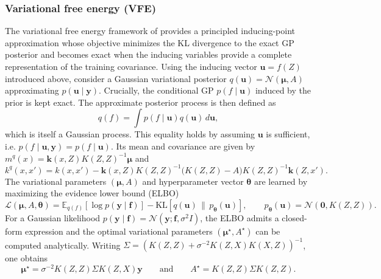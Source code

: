 \documentclass[11pt,a4paper]{article}
\newcommand{\bmu}{\boldsymbol{\mu}}
\newcommand{\by}{\boldsymbol{y}}
\newcommand{\btheta}{\boldsymbol{\theta}}
\begin{document}
\subsubsection{Variational free energy (VFE)}
The variational free energy framework of \cite{Titsias2009VariationalLO} provides a principled inducing-point approximation whose objective minimizes the KL divergence to the exact GP posterior and becomes exact when the inducing variables provide a complete representation of the training covariance. 
Using the inducing vector $\boldsymbol{u}=f(Z)$ introduced above, consider a Gaussian variational posterior $q(\boldsymbol{u})=\mathcal{N}(\bmu,A)$ approximating $p(\boldsymbol{u}\mid \by)$.
Crucially, the conditional GP $p(f\mid \boldsymbol{u})$ induced by the prior is kept exact.
The approximate posterior process is then defined as
\begin{displaymath}q(f)=\int p(f\mid \boldsymbol{u})q(\boldsymbol{u})\,d\boldsymbol{u},\end{displaymath}
which is itself a Gaussian process. This equality holds by assuming $\boldsymbol{u}$ is sufficient, i.e. \begin{math}
    p(f\mid \boldsymbol{u},\by)=p(f\mid \boldsymbol{u}).
\end{math}
Its mean and covariance are given by
$m^q(x)=\boldsymbol{k}(x,Z)K(Z,Z)^{-1}\bmu$ and
\begin{displaymath}
k^q(x,x')=k(x,x')-\boldsymbol{k}(x,Z)K(Z,Z)^{-1}
\bigl(K(Z,Z)-A\bigr)K(Z,Z)^{-1}\boldsymbol{k}(Z,x').
\end{displaymath}
The variational parameters $(\bmu,A)$ and hyperparameter vector $\btheta$ are learned by maximizing the evidence lower bound (ELBO)
\begin{displaymath}\mathcal{L}(\bmu,A,\btheta) = \mathbb{E}_{q(f)}[\log p(\by\mid \boldsymbol{f})] - \mathrm{KL}\!\left[q(\boldsymbol{u})\,\|\,p_{\btheta}(\boldsymbol{u})\right], \qquad p_{\btheta}(\boldsymbol{u})=\mathcal{N}(\bm 0,K(Z,Z)).\end{displaymath}
For a Gaussian likelihood $p(\by\mid \boldsymbol{f})=\mathcal{N}(\by;\boldsymbol{f},\sigma^2I)$, the ELBO admits a closed-form expression and the optimal
variational parameters $(\bmu^\star,A^\star)$ can be computed analytically.
Writing $\Sigma=(K(Z,Z)+\sigma^{-2}K(Z,X)K(X,Z))^{-1}$, one obtains
\begin{equation*}\bmu^\star=\sigma^{-2}K(Z,Z)\Sigma K(Z,X)\by \qquad \text{and} \qquad A^\star=K(Z,Z)\Sigma K(Z,Z).\end{equation*}
\end{document}
